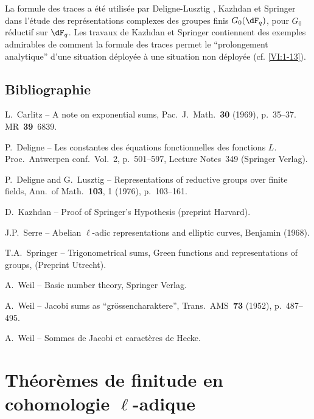 La formule des traces a été utilisée par Deligne-Lusztig , 
Kazhdan  et Springer  dans l'étude des 
représentations complexes des groupes finis $G_0(\dF_q)$, pour $G_0$ 
réductif sur $\dF_q$. Les travaux de Kazhdan et Springer contiennent des 
exemples admirables de comment la formule des traces permet le ``prolongement 
analytique'' d'une situation déployée à une situation non déployée 
(cf. \ref{VI:1-13}). 








\section*{Bibliographie}
\begin{enumerate}[{[}1{]}]
\item L.~Carlitz -- A note on exponential sums, Pac.~J.~Math.~\textbf{30} (1969), p.~35--37. MR~\textbf{39}~6839.
\item P.~Deligne -- Les constantes des équations fonctionnelles des fonctions $L$.
Proc.~Antwerpen conf.~Vol.~2, p.~501--597, Lecture Notes~349 (Springer Verlag).
\item P.~Deligne and G.~Lusztig -- Representations of reductive groups over finite fields,
Ann.~of Math.~\textbf{103}, 1 (1976), p.~103--161.
\item D.~Kazhdan -- Proof of Springer's Hypothesis (preprint Harvard).
\item J.P.~Serre -- Abelian $\ell$-adic representations and elliptic curves, Benjamin (1968).
\item T.A.~Springer -- Trigonometrical sums, Green functions and representations of
 groups, (Preprint Utrecht).
\item A.~Weil -- Basic number theory, Springer Verlag.
\item A.~Weil -- Jacobi sums as ``gr\"ossencharaktere'', Trans.~AMS~\textbf{73} (1952), p.~487--495.
\item A.~Weil -- Sommes de Jacobi et caractères de Hecke.
\end{enumerate}




\chapter{Théorèmes de finitude en cohomologie \texorpdfstring{$\ell$}{l}-adique}\label{VII}










